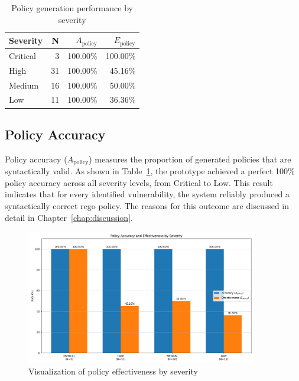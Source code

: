 \begin{table}[htbp]
	\centering
		\caption{Policy generation performance by severity}\label{tab:effectiveness-by-severity}
	\begin{tabular}{lrrr}
		\hline
		Severity & N & $A_{\text{policy}}$ & $E_{\text{policy}}$ \\
		\hline
		Critical & 3 & 100.00\% & 100.00\% \\
		High & 31 & 100.00\% & 45.16\% \\
		Medium & 16 & 100.00\% & 50.00\% \\
		Low & 11 & 100.00\% & 36.36\% \\
		\hline
	\end{tabular}
\end{table}

\subsection{Policy Accuracy}
Policy accuracy ($A_{\text{policy}}$) measures the proportion of generated policies that are syntactically valid. As shown in Table~\ref{tab:effectiveness-by-severity}, the prototype achieved a perfect 100\% policy accuracy across all severity levels, from Critical to Low. This result indicates that for every identified vulnerability, the system reliably produced a syntactically correct \gls{rego} policy. The reasons for this outcome are discussed in detail in Chapter~\ref{chap:discussion}.

\begin{figure}[htbp]
	\centering
	\includegraphics[width=0.9\textwidth]{Figures/effectiveness_by_severity.png}
	\caption{Visualization of policy effectiveness by severity}\label{fig:effectiveness-plot}
\end{figure}

